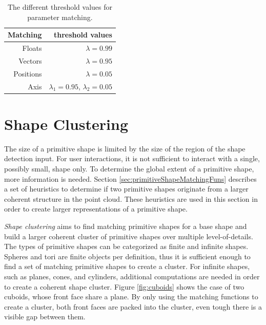 \begin{table}
\centering
\begin{tabular}{ r | r }
    Matching    & threshold values \\
    \hline
  Floats         & $\lambda = 0.99$ \\
    Vectors     & $\lambda = 0.95$ \\
  Positions & $\lambda = 0.05$ \\ 
    Axis             & $\lambda_1 = 0.95$, $\lambda_2 = 0.05$\\  

\end{tabular}
\caption[Different threshold values for parameter matching]
{The different threshold values for parameter matching.}
\label{tab:matchingThresholds}
\end{table}


\section{Shape Clustering}
\label{sec:shapeClustering}

The size of a primitive shape is limited by the size of the region of the shape detection input. For user interactions, it is not sufficient to interact with a single, possibly small, shape only. To determine the global extent of a primitive shape, more information is needed. Section \ref{sec:primitiveShapeMatchingFuns} describes a set of heuristics to determine if two primitive shapes originate from a larger coherent structure in the point cloud. These heuristics are used in this section in order to create larger representations of a primitive shape. 

\textit{Shape clustering} aims to find matching primitive shapes for a base shape and build a larger coherent cluster of primitive shapes over multiple level-of-details. The types of primitive shapes can be categorized as finite and infinite shapes. Spheres and tori are finite objects per definition, thus it is sufficient enough to find a set of matching primitive shapes to create a cluster. For infinite shapes, such as planes, cones, and cylinders, additional computations are needed in order to create a coherent shape cluster. Figure \ref{fig:cuboids} shows the case of two cuboids, whose front face share a plane. By only using the matching functions to create a cluster, both front faces are packed into the cluster, even tough there is a visible gap between them.

